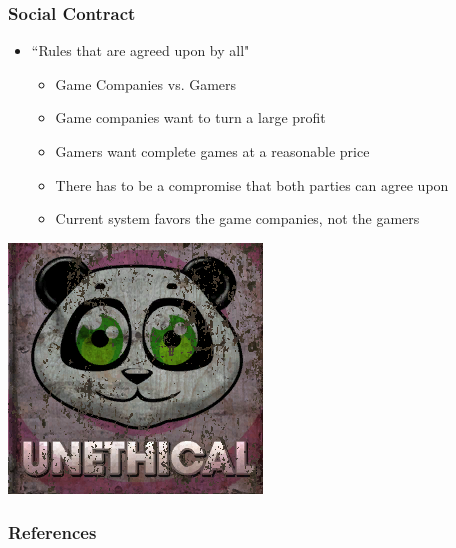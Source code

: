 \documentclass{beamer}
\begin{document}
\begin{frame}
\frametitle{Social Contract}
\begin{itemize}
\item ``Rules that are agreed upon by all"
\pause
\begin{itemize}
\item Game Companies vs. Gamers
\pause
\item Game companies want to turn a large profit
\pause
\item Gamers want complete games at a reasonable price
\pause
\item There has to be a compromise that both parties can agree upon
\pause
\item Current system favors the game companies, not the gamers
\end{itemize}
\end{itemize}
\begin{center}
\pause
\includegraphics[scale=0.3]{unethical}
\end{center}
\end{frame}

\begin{frame}[shrink=20]
\frametitle{References}
\vspace{1cm}
\nocite{*}


\end{frame}
\end{document}
